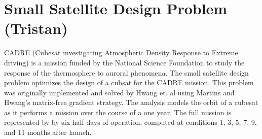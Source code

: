 \documentclass[]{aiaa-tc} %
\begin{document}
    \section{Small Satellite Design Problem (Tristan)}

    CADRE (Cubesat investigating Atmospheric Density Response to Extreme driving)
    is a mission funded by the National Science Foundation to study the
    response of the thermosphere to auroral phenomena\cite{cutler2011cubesat}.
    The small satellite design problem optimizes the design of a cubsat for the CADRE mission.
    This problem was originally implemented and solved by Hwang et. al\cite{CADRE2012} using
    Martins and Hwang's matrix-free gradient strategy. The analysis models the orbit of a cubesat
    as it performs a mission over the course of a one year. The full mission is represented by
    by six half-days of operation, computed at conditions 1, 3, 5, 7, 9, and 11 months after launch.
\end{document}
